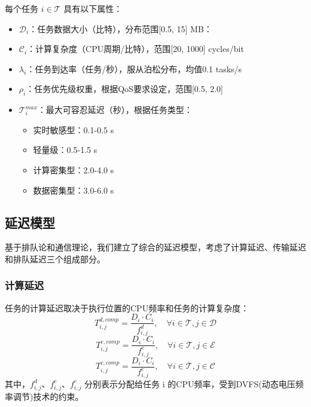 \documentclass[conference]{IEEEtran}
\begin{document}
每个任务 $i \in \mathcal{T}$ 具有以下属性：
\begin{itemize}
    \item $\mathcal{D}_{i}$：任务数据大小（比特），分布范围[0.5, 15] MB：
    \item $\mathcal{C}_{i}$：计算复杂度（CPU周期/比特），范围[20, 1000] cycles/bit
     \item $\mathcal{\lambda}_{i}$：任务到达率（任务/秒），服从泊松分布，均值0.1 tasks/s
    \item $\mathcal{\rho}_{i}$：任务优先级权重，根据QoS要求设定，范围[0.5, 2.0]
    \item $\mathcal{T}_{i}^{max}$：最大可容忍延迟（秒），根据任务类型：
    \begin{itemize}
        \item 实时敏感型：0.1-0.5 s
        \item 轻量级：0.5-1.5 s
        \item 计算密集型：2.0-4.0 s
        \item 数据密集型：3.0-6.0 s
    \end{itemize}
\end{itemize}
\subsection{延迟模型}
基于排队论和通信理论，我们建立了综合的延迟模型，考虑了计算延迟、传输延迟和排队延迟三个组成部分。
\subsubsection{计算延迟}
任务的计算延迟取决于执行位置的CPU频率和任务的计算复杂度：
\begin{equation}
T_{i,j}^{d,comp} = \frac{D_i \cdot C_i}{f_{i,j}^d}, \quad \forall i \in \mathcal{T}, j \in \mathcal{D}
\end{equation}
\begin{equation}
T_{i,j}^{e,comp} = \frac{D_i \cdot C_i}{f_{i,j}^e}, \quad \forall i \in \mathcal{T}, j \in \mathcal{E}
\end{equation}
\begin{equation}
T_{i,j}^{c,comp} = \frac{D_i \cdot C_i}{f_{i,j}^c}, \quad \forall i \in \mathcal{T}, j \in \mathcal{C}
\end{equation}
其中，${f}_{i,j}^{d}$、${f}_{i,j}^{e}$、${f}_{i,j}^{c}$ 分别表示分配给任务 i 的CPU频率，受到DVFS(动态电压频率调节)技术的约束。
\end{document}

